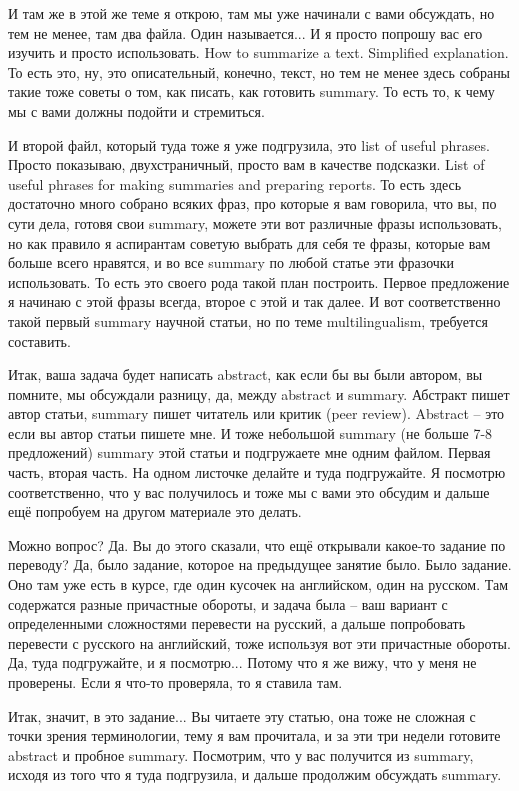 \documentclass[main.tex]{subfiles}
\begin{document}
И там же в этой же теме я открою, там мы уже начинали с вами обсуждать, но тем не менее, там два файла.
Один называется...
И я просто попрошу вас его изучить и просто использовать.
How to summarize a text.
Simplified explanation.
То есть это, ну, это описательный, конечно, текст, но тем не менее здесь собраны такие тоже советы о том, как писать, как готовить summary.
То есть то, к чему мы с вами должны подойти и стремиться.

И второй файл, который туда тоже я уже подгрузила, это list of useful phrases.
Просто показываю, двухстраничный, просто вам в качестве подсказки.
List of useful phrases for making summaries and preparing reports.
То есть здесь достаточно много собрано всяких фраз, про которые я вам говорила, что вы, по сути дела, готовя свои summary, можете эти вот различные фразы использовать, но как правило я аспирантам советую выбрать для себя те фразы, которые вам больше всего нравятся, и во все summary по любой статье эти фразочки использовать.
То есть это своего рода такой план построить.
Первое предложение я начинаю с этой фразы всегда, второе с этой и так далее.
И вот соответственно такой первый summary научной статьи, но по теме multilingualism, требуется составить.

Итак, ваша задача будет написать abstract, как если бы вы были автором, вы помните, мы обсуждали разницу, да, между abstract и summary.
Абстракт пишет автор статьи, summary пишет читатель или критик (peer review).
Abstract -- это если вы автор статьи пишете мне.
И тоже небольшой summary (не больше 7-8 предложений) summary этой статьи и подгружаете мне одним файлом.
Первая часть, вторая часть.
На одном листочке делайте и туда подгружайте.
Я посмотрю соответственно, что у вас получилось и тоже мы с вами это обсудим и дальше ещё попробуем на другом материале это делать.

Можно вопрос?
Да.
Вы до этого сказали, что ещё открывали какое-то задание по переводу?
Да, было задание, которое на предыдущее занятие было.
Было задание.
Оно там уже есть в курсе, где один кусочек на английском, один на русском.
Там содержатся разные причастные обороты, и задача была -- ваш вариант с определенными сложностями перевести на русский, а дальше попробовать перевести с русского на английский, тоже используя вот эти причастные обороты.
Да, туда подгружайте, и я посмотрю...
Потому что я же вижу, что у меня не проверены.
Если я что-то проверяла, то я ставила там.

Итак, значит, в это задание...
Вы читаете эту статью, она тоже не сложная с точки зрения терминологии, тему я вам прочитала, и за эти три недели готовите abstract и пробное summary.
Посмотрим, что у вас получится из summary, исходя из того что я туда подгрузила, и дальше продолжим обсуждать summary.
\end{document}
